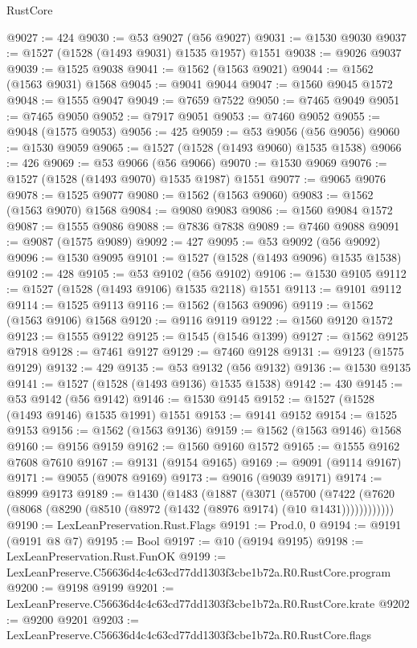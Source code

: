 \begin{lexlean}{RustCore}
\begin{coremodule}
@9027 := 424
@9030 := @53 @9027 (@56 @9027)
@9031 := @1530 @9030
@9037 := @1527 (@1528 (@1493 @9031) @1535 @1957) @1551
@9038 := @9026 @9037
@9039 := @1525 @9038
@9041 := @1562 (@1563 @9021)
@9044 := @1562 (@1563 @9031) @1568
@9045 := @9041 @9044
@9047 := @1560 @9045 @1572
@9048 := @1555 @9047
@9049 := @7659 @7522
@9050 := @7465 @9049
@9051 := @7465 @9050
@9052 := @7917 @9051
@9053 := @7460 @9052
@9055 := @9048 (@1575 @9053)
@9056 := 425
@9059 := @53 @9056 (@56 @9056)
@9060 := @1530 @9059
@9065 := @1527 (@1528 (@1493 @9060) @1535 @1538)
@9066 := 426
@9069 := @53 @9066 (@56 @9066)
@9070 := @1530 @9069
@9076 := @1527 (@1528 (@1493 @9070) @1535 @1987) @1551
@9077 := @9065 @9076
@9078 := @1525 @9077
@9080 := @1562 (@1563 @9060)
@9083 := @1562 (@1563 @9070) @1568
@9084 := @9080 @9083
@9086 := @1560 @9084 @1572
@9087 := @1555 @9086
@9088 := @7836 @7838
@9089 := @7460 @9088
@9091 := @9087 (@1575 @9089)
@9092 := 427
@9095 := @53 @9092 (@56 @9092)
@9096 := @1530 @9095
@9101 := @1527 (@1528 (@1493 @9096) @1535 @1538)
@9102 := 428
@9105 := @53 @9102 (@56 @9102)
@9106 := @1530 @9105
@9112 := @1527 (@1528 (@1493 @9106) @1535 @2118) @1551
@9113 := @9101 @9112
@9114 := @1525 @9113
@9116 := @1562 (@1563 @9096)
@9119 := @1562 (@1563 @9106) @1568
@9120 := @9116 @9119
@9122 := @1560 @9120 @1572
@9123 := @1555 @9122
@9125 := @1545 (@1546 @1399)
@9127 := @1562 @9125 @7918
@9128 := @7461 @9127
@9129 := @7460 @9128
@9131 := @9123 (@1575 @9129)
@9132 := 429
@9135 := @53 @9132 (@56 @9132)
@9136 := @1530 @9135
@9141 := @1527 (@1528 (@1493 @9136) @1535 @1538)
@9142 := 430
@9145 := @53 @9142 (@56 @9142)
@9146 := @1530 @9145
@9152 := @1527 (@1528 (@1493 @9146) @1535 @1991) @1551
@9153 := @9141 @9152
@9154 := @1525 @9153
@9156 := @1562 (@1563 @9136)
@9159 := @1562 (@1563 @9146) @1568
@9160 := @9156 @9159
@9162 := @1560 @9160 @1572
@9165 := @1555 @9162 @7608 @7610
@9167 := @9131 (@9154 @9165)
@9169 := @9091 (@9114 @9167)
@9171 := @9055 (@9078 @9169)
@9173 := @9016 (@9039 @9171)
@9174 := @8999 @9173
@9189 := @1430
    (@1483
      (@1887
        (@3071
          (@5700
            (@7422 (@7620 (@8068 (@8290 (@8510 (@8972 (@1432 (@8976 @9174) (@10 @1431))))))))))))
@9190 := LexLeanPreservation.Rust.Flags
@9191 := Prod.{0, 0}
@9194 := @9191 (@9191 @8 @7)
@9195 := Bool
@9197 := @10 (@9194 @9195)
@9198 := LexLeanPreservation.Rust.FunOK
@9199 := LexLeanPreserve.C56636d4c4c63cd77dd1303f3cbe1b72a.R0.RustCore.program
@9200 := @9198 @9199
@9201 := LexLeanPreserve.C56636d4c4c63cd77dd1303f3cbe1b72a.R0.RustCore.krate
@9202 := @9200 @9201
@9203 := LexLeanPreserve.C56636d4c4c63cd77dd1303f3cbe1b72a.R0.RustCore.flags

\end{coremodule}
\end{lexlean}
